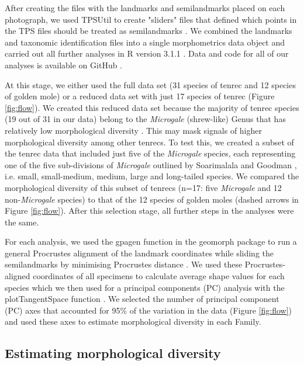 \documentclass[12pt,a4paper]{article}
\begin{document}
	
	After creating the files with the landmarks and semilandmarks placed on each photograph, we used TPSUtil \citep{Rohlf2012} to create "sliders" files that defined which points in the TPS files should be treated as semilandmarks \citep{Zelditch2012}. We combined the landmarks and taxonomic identification files into a single morphometrics data object and carried out all further analyses in R version 3.1.1 \citep{Team2014}. Data and code for all of our analyses is available on GitHub \citep{Finlay2015c}.
	
	At this stage, we either used the full data set (31 species of tenrec and 12 species of golden mole) or a reduced data set with just 17 species of tenrec (Figure \ref{fig:flow}). We created this reduced data set because the majority of tenrec species (19 out of 31 in our data) belong to the \textit{Microgale} (shrew-like) Genus that has relatively low morphological diversity \citep{Soarimalala2011, Jenkins2003}. This may mask signals of higher morphological diversity among other tenrecs. To test this, we created a subset of the tenrec data that included just five of the \textit{Microgale} species, each representing one of the five sub-divisions of \textit{Microgale} outlined by Soarimalala and Goodman \citeyearpar{Soarimalala2011}, i.e. small, small-medium, medium, large and long-tailed species. We compared the morphological diversity of this subset of tenrecs (n=17: five \textit{Microgale} and 12 non-\textit{Microgale} species) to that of the 12 species of golden moles (dashed arrows in Figure \ref{fig:flow}). After this selection stage, all further steps in the analyses were the same.
	
		
	For each analysis, we used the gpagen function in the geomorph package \citep{Adams2013} to run a general Procrustes alignment \citep{Rohlf1993} of the landmark coordinates while sliding the semilandmarks by minimising Procrustes distance \citep{Bookstein1997}. We used these Procrustes-aligned coordinates of all specimens to calculate average shape values for each species which we then used for a principal components (PC) analysis with the plotTangentSpace function \citep{Adams2013}. We selected the number of principal component (PC) axes that accounted for 95\% of the variation in the data (Figure \ref{fig:flow}) and used these axes to estimate morphological diversity in each Family.
\subsection{Estimating morphological diversity}
	
\end{document}
